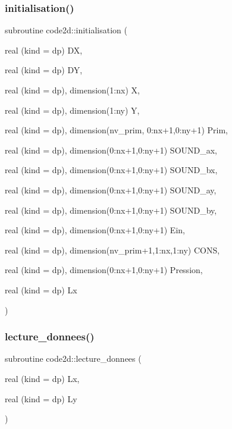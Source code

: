 \subsubsection{\texorpdfstring{initialisation()}{initialisation()}}
{\footnotesize\ttfamily subroutine code2d\+::initialisation (\begin{DoxyParamCaption}\item[{real (kind = dp)}]{DX,  }\item[{real (kind = dp)}]{DY,  }\item[{real (kind = dp), dimension(1\+:nx)}]{X,  }\item[{real (kind = dp), dimension(1\+:ny)}]{Y,  }\item[{real (kind = dp), dimension(nv\+\_\+prim, 0\+:nx+1,0\+:ny+1)}]{Prim,  }\item[{real (kind = dp), dimension(0\+:nx+1,0\+:ny+1)}]{S\+O\+U\+N\+D\+\_\+ax,  }\item[{real (kind = dp), dimension(0\+:nx+1,0\+:ny+1)}]{S\+O\+U\+N\+D\+\_\+bx,  }\item[{real (kind = dp), dimension(0\+:nx+1,0\+:ny+1)}]{S\+O\+U\+N\+D\+\_\+ay,  }\item[{real (kind = dp), dimension(0\+:nx+1,0\+:ny+1)}]{S\+O\+U\+N\+D\+\_\+by,  }\item[{real (kind = dp), dimension(0\+:nx+1,0\+:ny+1)}]{Ein,  }\item[{real (kind = dp), dimension(nv\+\_\+prim+1,1\+:nx,1\+:ny)}]{C\+O\+NS,  }\item[{real (kind = dp), dimension(0\+:nx+1,0\+:ny+1)}]{Pression,  }\item[{real (kind = dp)}]{Lx }\end{DoxyParamCaption})}

\mbox{\label{main2Dv1_8f90_a7e06ba833aef7743b6a2f1be79f4bc2e}} 
\subsubsection{\texorpdfstring{lecture\+\_\+donnees()}{lecture\_donnees()}}
{\footnotesize\ttfamily subroutine code2d\+::lecture\+\_\+donnees (\begin{DoxyParamCaption}\item[{real (kind = dp)}]{Lx,  }\item[{real (kind = dp)}]{Ly }\end{DoxyParamCaption})}

